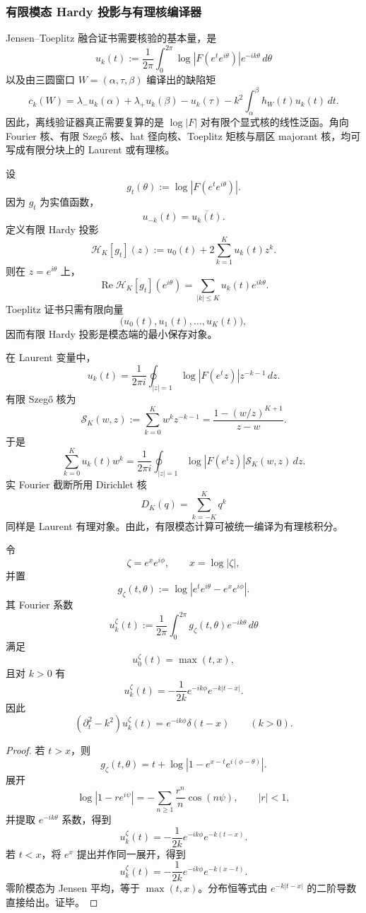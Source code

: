 \subsubsection{有限模态 Hardy 投影与有理核编译器}\label{subsubsec:typed-address-biaxial-completion-finite-mode-hardy-rational-kernel-compiler}
Jensen--Toeplitz 融合证书需要核验的基本量，是
\[
u_k(t)
:=
\frac1{2\pi}
\int_0^{2\pi}
\log |F(e^te^{i\theta})|
e^{-ik\theta}\,d\theta
\]
以及由三圆窗口 \(W=(\alpha,\tau,\beta)\) 编译出的缺陷矩
\[
c_k(W)
=
\lambda_-u_k(\alpha)
+\lambda_+u_k(\beta)
-u_k(\tau)
-k^2\int_\alpha^\beta h_W(t)u_k(t)\,dt .
\]
因此，离线验证器真正需要复算的是 \(\log|F|\) 对有限个显式核的线性泛函。角向 Fourier 核、有限 Szeg\H{o} 核、hat 径向核、Toeplitz 矩核与扇区 majorant 核，均可写成有限分块上的 Laurent 或有理核。

设
\[
g_t(\theta):=\log|F(e^te^{i\theta})|.
\]
因为 \(g_t\) 为实值函数，
\[
u_{-k}(t)=\overline{u_k(t)}.
\]
定义有限 Hardy 投影
\[
\mathcal H_K[g_t](z)
:=
u_0(t)+2\sum_{k=1}^K u_k(t)z^k .
\]
则在 \(z=e^{i\theta}\) 上，
\[
\operatorname{Re}\mathcal H_K[g_t](e^{i\theta})
=
\sum_{|k|\le K}u_k(t)e^{ik\theta}.
\]
Toeplitz 证书只需有限向量
\[
\bigl(u_0(t),u_1(t),\ldots,u_K(t)\bigr),
\]
因而有限 Hardy 投影是模态端的最小保存对象。

在 Laurent 变量中，
\[
u_k(t)
=
\frac1{2\pi i}
\oint_{|z|=1}
\log|F(e^tz)|z^{-k-1}\,dz .
\]
有限 Szeg\H{o} 核为
\[
\mathcal S_K(w,z)
:=
\sum_{k=0}^K w^kz^{-k-1}
=
\frac{1-(w/z)^{K+1}}{z-w}.
\]
于是
\[
\sum_{k=0}^K u_k(t)w^k
=
\frac1{2\pi i}
\oint_{|z|=1}
\log|F(e^tz)|\mathcal S_K(w,z)\,dz .
\]
实 Fourier 截断所用 Dirichlet 核
\[
D_K(q)=\sum_{k=-K}^K q^k
\]
同样是 Laurent 有理对象。由此，有限模态计算可被统一编译为有理核积分。

\begin{lemma}\label{lem:typed-address-biaxial-completion-single-zero-hardy-green-kernel}
令
\[
\zeta=e^xe^{i\phi},
\qquad x=\log|\zeta|,
\]
并置
\[
g_\zeta(t,\theta):=
\log|e^te^{i\theta}-e^xe^{i\phi}|.
\]
其 Fourier 系数
\[
u_k^\zeta(t):=
\frac1{2\pi}\int_0^{2\pi}
g_\zeta(t,\theta)e^{-ik\theta}\,d\theta
\]
满足
\[
u_0^\zeta(t)=\max(t,x),
\]
且对 \(k>0\) 有
\[
u_k^\zeta(t)
=
-\frac1{2k}
e^{-ik\phi}e^{-k|t-x|}.
\]
因此
\[
(\partial_t^2-k^2)u_k^\zeta(t)
=
e^{-ik\phi}\delta(t-x)
\qquad(k>0).
\]
\end{lemma}
\begin{proof}
若 \(t>x\)，则
\[
g_\zeta(t,\theta)
=
t+\log|1-e^{x-t}e^{i(\phi-\theta)}|.
\]
展开
\[
\log|1-re^{i\psi}|
=
-\sum_{n\ge1}\frac{r^n}{n}\cos(n\psi),
\qquad |r|<1,
\]
并提取 \(e^{-ik\theta}\) 系数，得到
\[
u_k^\zeta(t)
=
-\frac1{2k}e^{-ik\phi}e^{-k(t-x)}.
\]
若 \(t<x\)，将 \(e^x\) 提出并作同一展开，得到
\[
u_k^\zeta(t)
=
-\frac1{2k}e^{-ik\phi}e^{-k(x-t)}.
\]
零阶模态为 Jensen 平均，等于 \(\max(t,x)\)。分布恒等式由 \(e^{-k|t-x|}\) 的二阶导数直接给出。证毕。
\end{proof}

